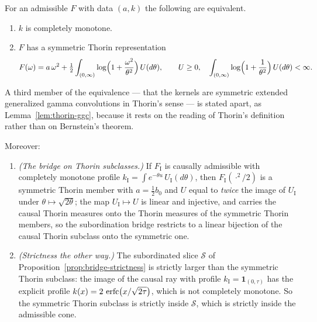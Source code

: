 \begin{proposition}\label{prop:thorin-subclass}
For an admissible $F$ with data $(a,k)$ the following are equivalent.
\begin{enumerate}
\item $k$ is completely monotone.
\item $F$ has a symmetric Thorin representation
\begin{equation}\label{eq:thorin}
  F(\omega) = a\,\omega^2
   + \tfrac12\int_{(0,\infty)} \log\Bigl(1 + \frac{\omega^2}{\theta^2}\Bigr)\,U(d\theta),
  \qquad U \ge 0, \quad
  \int_{(0,\infty)}\log\Bigl(1 + \frac{1}{\theta^2}\Bigr)\,U(d\theta) < \infty .
\end{equation}
\end{enumerate}
A third member of the equivalence --- that the kernels are symmetric extended generalized gamma
convolutions in Thorin's sense --- is stated apart, as Lemma~\ref{lem:thorin-ggc}, because it
rests on the reading of Thorin's definition rather than on Bernstein's theorem.

Moreover:
\begin{enumerate}
\item[(3)] \emph{(The bridge on Thorin subclasses.)} If $F_{\mathrm I}$ is causally admissible
with completely monotone profile $k_{\mathrm I} = \int e^{-\theta u}\,U_{\mathrm I}(d\theta)$,
then $F_{\mathrm I}(\cdot^2/2)$ is a symmetric Thorin member with $a = \tfrac12 b_0$ and $U$
equal to \emph{twice} the image of $U_{\mathrm I}$ under $\theta \mapsto \sqrt{2\theta}$; the
map $U_{\mathrm I} \mapsto U$ is linear and injective, and carries the causal Thorin measures
onto the Thorin measures of the symmetric Thorin members, so the subordination bridge restricts
to a linear bijection of the causal Thorin subclass onto the symmetric one.
\item[(4)] \emph{(Strictness the other way.)} The subordinated slice $\mathcal{S}$ of
Proposition~\ref{prop:bridge-strictness} is strictly larger than the symmetric Thorin subclass:
the image of the causal ray with profile $k_{\mathrm I} = \mathbf 1_{(0,\tau)}$ has the explicit
profile $k(x) = 2\,\operatorname{erfc}\bigl(x/\sqrt{2\tau}\bigr)$, which is not completely monotone. So the
symmetric Thorin subclass is strictly inside $\mathcal{S}$, which is strictly inside the
admissible cone.
\end{enumerate}
\end{proposition}

